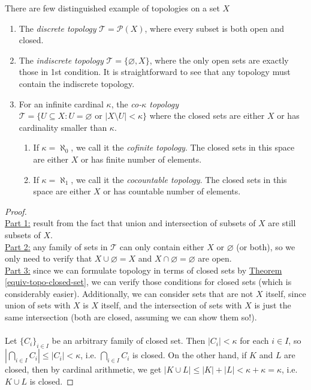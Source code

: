 \documentclass{treatise}
\begin{document}
\begin{example}
There are few distinguished example of topologies on a set $X$
\begin{enumerate}
    \item The \emph{discrete topology} $\mathcal{T} = \mathcal{P}(X)$, where every subset is both open and closed.
    \item The \emph{indiscrete topology} $\mathcal{T} = \{ \varnothing, X \}$, where the only open sets are exactly those in 1st condition. It is straightforward to see that any topology must contain the indiscrete topology.
    \item For an infinite cardinal $\kappa$, the \emph{co-$\kappa$ topology} $\mathcal{T} = \{ U \subseteq X : U = \varnothing \mbox{ or } |X \setminus U| < \kappa \}$ where the closed sets are either $X$ or has cardinality smaller than $\kappa$.
    \begin{enumerate}
        \item If $\kappa = \aleph_0$, we call it the \emph{cofinite topology}. The closed sets in this space are either $X$ or has finite number of elements.
        \item If $\kappa = \aleph_1$, we call it the \emph{cocountable topology}. The closed sets in this space are either $X$ or has countable number of elements.
    \end{enumerate}
\end{enumerate}
\end{example}
\begin{proof}\ \\
\underline{Part 1:} result from the fact that union and intersection of subsets of $X$ are still subsets of $X$.
\\
\underline{Part 2:} any family of sets in $\mathcal{T}$ can only contain either $X$ or $\varnothing$ (or both), so we only need to verify that $X \cup \varnothing = X$ and $X \cap \varnothing = \varnothing$ are open.
\\
\underline{Part 3:} since we can formulate topology in terms of closed sets by \hyperref[equiv-topo-closed-set]{Theorem \ref*{equiv-topo-closed-set}}, we can verify those conditions for closed sets (which is considerably easier). Additionally, we can consider sets that are not $X$ itself, since union of sets with $X$ is $X$ itself, and the intersection of sets with $X$ is just the same intersection (both are closed, assuming we can show them so!).
\\
\\
Let $\{ C_i \}_{i \in I}$ be an arbitrary family of closed set. Then $|C_i| < \kappa$ for each $i \in I$, so $|\bigcap_{i \in I} C_i| \leq |C_i| < \kappa$, i.e. $\bigcap_{i \in I} C_i$ is closed. On the other hand, if $K$ and $L$ are closed, then by cardinal arithmetic, we get $|K \cup L| \leq |K| + |L| < \kappa + \kappa = \kappa$, i.e. $K \cup L$ is closed.
\end{proof}
\end{document}
